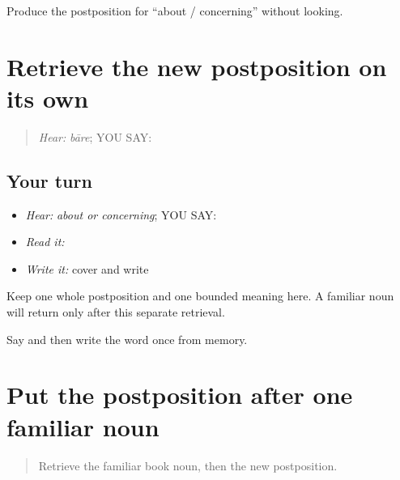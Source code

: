 \begin{tcolorbox}[breakable,colback=teal!4,colframe=teal!35!black,title={Before you move on}]
Produce the postposition for “about / concerning” without looking.
\end{tcolorbox}
\section[\texorpdfstring{\pa{ਬਾਰੇ} (baare)}{ਬਾਰੇ (baare)}]{Retrieve the new postposition on its own}

\label{lesson:PA-C203-baare-review}



\begin{quote}
\emph{Hear:} \emph{bāre}; YOU SAY: \textbf{}
\end{quote}

\subsection*{Your turn}
\begin{itemize}
\raggedright
  \item \emph{Hear:} \emph{about or concerning}; YOU SAY: \textbf{}
  \item \emph{Read it:} \textbf{}
  \item \emph{Write it:} cover and write \textbf{}
\end{itemize}

\begin{grammarlens}[title={Grammar Lens}]
Keep one whole postposition and one bounded meaning here. A familiar noun will return only after this separate retrieval.
\end{grammarlens}

\begin{tcolorbox}[breakable,colback=teal!4,colframe=teal!35!black,title={Before you move on}]
Say and then write the word once from memory.
\end{tcolorbox}
\section[\texorpdfstring{\pa{ਕਿਤਾਬ} \pa{ਬਾਰੇ} (kitaab baare)}{ਕਿਤਾਬ ਬਾਰੇ (kitaab baare)}]{Put the postposition after one familiar noun}

\label{lesson:PA-C203-about-the-book}



\begin{quote}
Retrieve the familiar book noun, then the new postposition.
\end{quote}

